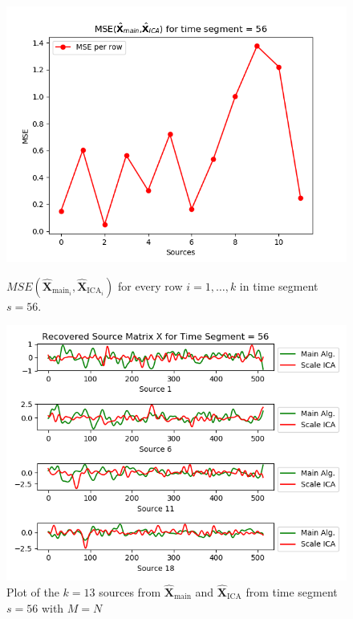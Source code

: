 \begin{figure}[H]
\begin{widepage}
    \begin{minipage}[t]{.45\textwidth}
\centering
\includegraphics[width=1\linewidth]{figures/ch_7/mse_non_removed_ica_timeseg55.png}
\caption{$MSE\left(\hat{\mathbf{X}}_{\text{main}_{i}},\hat{\mathbf{X}}_{\text{ICA}_{i}}\right)$ for every row $i = 1, \hdots, k$ in time segment $s=56$.}
\label{fig:M=N_2}
\end{minipage} 
\hspace{0.5cm}
\begin{minipage}[t]{.45\textwidth}
\centering
\includegraphics[width=1\linewidth]{figures/ch_7/EEG_non_removed_scaled_timeseg55S1_CClean.png}
\caption{Plot of the $k = 13$ sources from $\hat{\mathbf{X}}_{\text{main}}$ and $\hat{\mathbf{X}}_{\text{ICA}}$ from time segment $s = 56$ with $M=N$}
	\label{fig:M=N_3}
    \end{minipage}
\end{widepage}
\end{figure}
